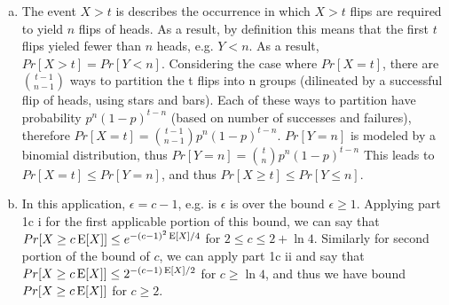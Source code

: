 \documentclass[11pt]{article}
\begin{document}
\begin{enumerate}[(a)]
\item
\begin{solution}
    The event $X > t$ is describes the occurrence in which $X > t$ flips are required to yield $n$ flips of heads. As a result, by definition this means that the first $t$ flips yieled fewer than $n$ heads, e.g. $Y < n$. As a result, $Pr[X > t] = Pr[Y < n]$. Considering the case where $Pr[X = t]$, there are $\binom{t-1}{n-1}$ ways to partition the t flips into n groups (dilineated by a successful flip of heads, using stars and bars). Each of these ways to partition have probability $p^n(1-p)^{t-n}$ (based on number of successes and failures), therefore $Pr[X = t] = \binom{t-1}{n-1}p^n(1-p)^{t-n}$. $Pr[Y = n]$ is modeled by a binomial distribution, thus $Pr[Y = n] = \binom{t}{n}p^n(1-p)^{t-n}$ This leads to $Pr[X = t] \leq Pr[Y = n]$, and thus $Pr[X \geq t] \leq Pr[Y \leq n]$.
    \\
\end{solution}

\item
\begin{solution}
    In this application, $\epsilon = c - 1$, e.g. is $\epsilon$ is over the bound $\epsilon \geq 1$. Applying part 1c i for the first applicable portion of this bound, we can say that $Pr[X \geq c\operatorname{E}[X]] \leq e^{-(c-1)^2\operatorname{E}[X]/4}$ for $2 \leq c \leq 2 + \ln{4}$. Similarly for second portion of the bound of $c$,  we can apply part 1c ii and say that $Pr[X \geq c\operatorname{E}[X]] \leq 2^{-(c-1)\operatorname{E}[X]/2}$ for $c \geq \ln{4}$, and thus we have bound $Pr[X \geq c\operatorname{E}[X]]$ for $c \geq 2$.
\end{solution}

\end{enumerate}

\clearpage
\end{document}
